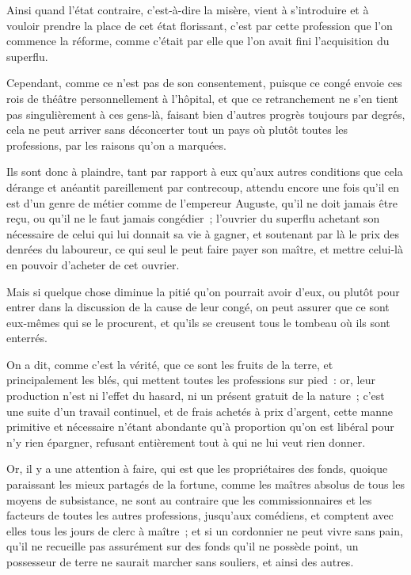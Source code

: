 \documentclass[french,twoside]{book} %
\begin{document}
Ainsi quand l’état contraire, c’est-à-dire la misère, vient à s’introduire et à vouloir prendre la place de cet état florissant, c’est par cette profession que l’on commence la réforme, comme c’était par elle que l’on avait fini l’acquisition du superflu.\par
Cependant, comme ce n’est pas de son consentement, puisque ce congé envoie ces rois de théâtre personnellement à l’hôpital, et que ce retranchement ne s’en tient pas singulièrement à ces gens-là, faisant bien d’autres progrès toujours par degrés, cela ne peut arriver sans déconcerter tout un pays où plutôt toutes les professions, par les raisons qu’on a marquées.\par
Ils sont donc à plaindre, tant par rapport à eux qu’aux autres conditions que cela dérange et anéantit pareillement par contrecoup, attendu encore une fois qu’il en est d’un genre de métier comme de l’empereur Auguste, qu’il ne doit jamais être reçu, ou qu’il ne le faut jamais congédier ; l’ouvrier du superflu achetant son nécessaire de celui qui lui donnait sa vie à gagner, et soutenant par là le prix des denrées du laboureur, ce qui seul le peut faire payer son maître, et mettre celui-là en pouvoir d’acheter de cet ouvrier.\par
Mais si quelque chose diminue la pitié qu’on pourrait avoir d’eux, ou plutôt pour entrer dans la discussion de la cause de leur congé, on peut assurer que ce sont eux-mêmes qui se le procurent, et qu’ils se creusent tous le tombeau où ils sont enterrés.\par
On a dit, comme c’est la vérité, que ce sont les fruits de la terre, et principalement les blés, qui mettent toutes les professions sur pied : or, leur production n’est ni l’effet du hasard, ni un présent gratuit de la nature ; c’est une suite d’un travail continuel, et de frais achetés à prix d’argent, cette manne primitive et nécessaire n’étant abondante qu’à proportion qu’on est libéral pour n’y rien épargner, refusant entièrement tout à qui ne lui veut rien donner.\par
Or, il y a une attention à faire, qui est que les propriétaires des fonds, quoique paraissant les mieux partagés de la fortune, comme les maîtres absolus de tous les moyens de subsistance, ne sont au contraire que les commissionnaires et les facteurs de toutes les autres professions, jusqu’aux comédiens, et comptent avec elles tous les jours de clerc à maître ; et si un cordonnier ne peut vivre sans pain, qu’il ne recueille pas assurément sur des fonds qu’il ne possède point, un possesseur de terre ne saurait marcher sans souliers, et ainsi des autres.\par
\end{document}
